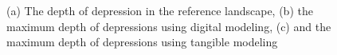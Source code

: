 \documentclass{isprs}
\begin{document}
\begin{figure}
\begin{center}
\caption{(a) The depth of depression in the reference landscape, (b) the maximum depth of depressions using digital modeling, (c) and the maximum depth of depressions using tangible modeling}
\label{fig:max_depressions}
\end{center}
\end{figure}
%
%
\end{document}
